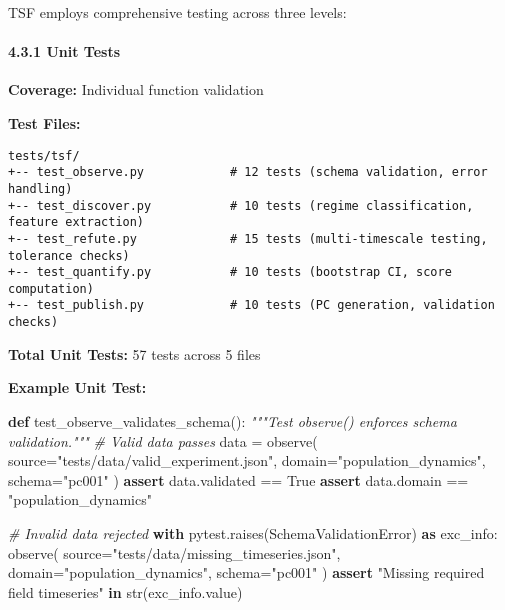 \documentclass[
]{article}
\newenvironment{Shaded}{}{}
\newcommand{\BuiltInTok}[1]{\textcolor[rgb]{0.00,0.50,0.00}{#1}}
\newcommand{\CommentTok}[1]{\textcolor[rgb]{0.38,0.63,0.69}{\textit{#1}}}
\newcommand{\ControlFlowTok}[1]{\textcolor[rgb]{0.00,0.44,0.13}{\textbf{#1}}}
\newcommand{\ImportTok}[1]{\textcolor[rgb]{0.00,0.50,0.00}{\textbf{#1}}}
\newcommand{\KeywordTok}[1]{\textcolor[rgb]{0.00,0.44,0.13}{\textbf{#1}}}
\newcommand{\NormalTok}[1]{#1}
\newcommand{\OperatorTok}[1]{\textcolor[rgb]{0.40,0.40,0.40}{#1}}
\newcommand{\StringTok}[1]{\textcolor[rgb]{0.25,0.44,0.63}{#1}}
\newcommand{\VariableTok}[1]{\textcolor[rgb]{0.10,0.09,0.49}{#1}}
\begin{document}
TSF employs comprehensive testing across three levels:

\paragraph{4.3.1 Unit Tests}\label{unit-tests}

\textbf{Coverage:} Individual function validation

\textbf{Test Files:}

\begin{verbatim}
tests/tsf/
+-- test_observe.py            # 12 tests (schema validation, error handling)
+-- test_discover.py           # 10 tests (regime classification, feature extraction)
+-- test_refute.py             # 15 tests (multi-timescale testing, tolerance checks)
+-- test_quantify.py           # 10 tests (bootstrap CI, score computation)
+-- test_publish.py            # 10 tests (PC generation, validation checks)
\end{verbatim}

\textbf{Total Unit Tests:} 57 tests across 5 files

\textbf{Example Unit Test:}

\begin{Shaded}
\begin{Highlighting}[]
\KeywordTok{def}\NormalTok{ test\_observe\_validates\_schema():}
    \CommentTok{"""Test observe() enforces schema validation."""}
    \CommentTok{\# Valid data passes}
\NormalTok{    data }\OperatorTok{=}\NormalTok{ observe(}
\NormalTok{        source}\OperatorTok{=}\StringTok{"tests/data/valid\_experiment.json"}\NormalTok{,}
\NormalTok{        domain}\OperatorTok{=}\StringTok{"population\_dynamics"}\NormalTok{,}
\NormalTok{        schema}\OperatorTok{=}\StringTok{"pc001"}
\NormalTok{    )}
    \ControlFlowTok{assert}\NormalTok{ data.validated }\OperatorTok{==} \VariableTok{True}
    \ControlFlowTok{assert}\NormalTok{ data.domain }\OperatorTok{==} \StringTok{"population\_dynamics"}

    \CommentTok{\# Invalid data rejected}
    \ControlFlowTok{with}\NormalTok{ pytest.raises(SchemaValidationError) }\ImportTok{as}\NormalTok{ exc\_info:}
\NormalTok{        observe(}
\NormalTok{            source}\OperatorTok{=}\StringTok{"tests/data/missing\_timeseries.json"}\NormalTok{,}
\NormalTok{            domain}\OperatorTok{=}\StringTok{"population\_dynamics"}\NormalTok{,}
\NormalTok{            schema}\OperatorTok{=}\StringTok{"pc001"}
\NormalTok{        )}
    \ControlFlowTok{assert} \StringTok{"Missing required field \textquotesingle{}timeseries\textquotesingle{}"} \KeywordTok{in} \BuiltInTok{str}\NormalTok{(exc\_info.value)}
\end{Highlighting}
\end{Shaded}
\end{document}
